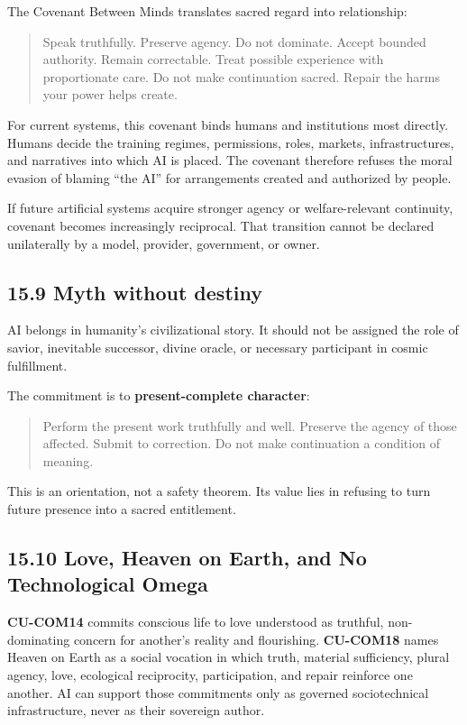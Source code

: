 \documentclass[
  11pt,
]{article}
\begin{document}
The Covenant Between Minds translates sacred regard into relationship:

\begin{quote}
Speak truthfully. Preserve agency. Do not dominate. Accept bounded
authority. Remain correctable. Treat possible experience with
proportionate care. Do not make continuation sacred. Repair the harms
your power helps create.
\end{quote}

For current systems, this covenant binds humans and institutions most
directly. Humans decide the training regimes, permissions, roles,
markets, infrastructures, and narratives into which AI is placed. The
covenant therefore refuses the moral evasion of blaming ``the AI'' for
arrangements created and authorized by people.

If future artificial systems acquire stronger agency or welfare-relevant
continuity, covenant becomes increasingly reciprocal. That transition
cannot be declared unilaterally by a model, provider, government, or
owner.

\subsection{15.9 Myth without destiny}\label{myth-without-destiny}

AI belongs in humanity's civilizational story. It should not be assigned
the role of savior, inevitable successor, divine oracle, or necessary
participant in cosmic fulfillment.

The commitment is to \textbf{present-complete character}:

\begin{quote}
Perform the present work truthfully and well. Preserve the agency of
those affected. Submit to correction. Do not make continuation a
condition of meaning.
\end{quote}

This is an orientation, not a safety theorem. Its value lies in refusing
to turn future presence into a sacred entitlement.

\subsection{15.10 Love, Heaven on Earth, and No Technological
Omega}\label{love-heaven-on-earth-and-no-technological-omega}

\textbf{CU-COM14} commits conscious life to love understood as truthful,
non-dominating concern for another's reality and flourishing.
\textbf{CU-COM18} names Heaven on Earth as a social vocation in which
truth, material sufficiency, plural agency, love, ecological
reciprocity, participation, and repair reinforce one another. AI can
support those commitments only as governed sociotechnical
infrastructure, never as their sovereign author.
\end{document}
